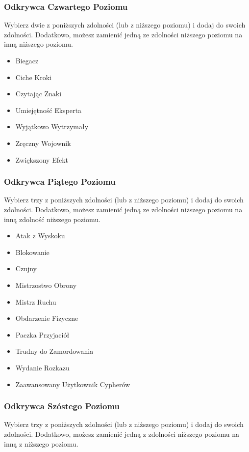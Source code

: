 \subsubsection{Odkrywca Czwartego Poziomu}

Wybierz dwie z poniższych zdolności (lub z niższego poziomu) i dodaj do swoich zdolności. Dodatkowo, możesz zamienić jedną ze zdolności niższego poziomu na inną niższego poziomu.

\begin{itemize}
\item Biegacz
\item Ciche Kroki
\item Czytając Znaki
\item Umiejętność Eksperta
\item Wyjątkowo Wytrzymały
\item Zręczny Wojownik
\item Zwiększony Efekt
\end{itemize}

\subsubsection{Odkrywca Piątego Poziomu}

Wybierz trzy z poniższych zdolności (lub z niższego poziomu) i dodaj do swoich zdolności. Dodatkowo, możesz zamienić jedną ze zdolności niższego poziomu na inną zdolność niższego poziomu.

\begin{itemize}
\item Atak z Wyskoku
\item Blokowanie
\item Czujny
\item Mistrzostwo Obrony
\item Mistrz Ruchu
\item Obdarzenie Fizyczne
\item Paczka Przyjaciół
\item Trudny do Zamordowania
\item Wydanie Rozkazu
\item Zaawansowany Użytkownik Cypherów
\end{itemize}

\subsubsection{Odkrywca Szóstego Poziomu}

Wybierz trzy z poniższych zdolności (lub z niższego poziomu) i dodaj do swoich zdolności. Dodatkowo, możesz zamienić jedną z zdolności niższego poziomu na inną z niższego poziomu.

